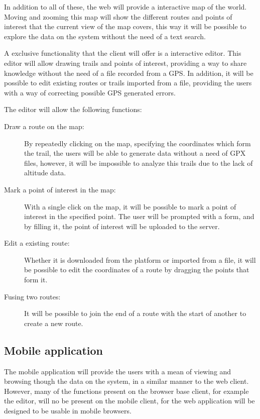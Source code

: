 In addition to all of these, the web will provide a interactive map of the world. Moving and zooming this map will show the different routes and points of interest that the current view of the map covers, this way it will be possible to explore the data on the system without the need of a text search.

A exclusive functionality that the client will offer is a interactive editor. This editor will allow drawing trails and points of interest, providing a way to share knowledge without the need of a file recorded from a GPS. In addition, it will be possible to edit existing routes or trails imported from a file, providing the users with a way of correcting possible GPS generated errors.

The editor will allow the following functions:

\begin{description}
\item[Draw a route on the map:] By repeatedly clicking on the map, specifying the coordinates which form the trail, the users will be able to generate data without a need of GPX files, however, it will be impossible to analyze this trails due to the lack of altitude data.

\item[Mark a point of interest in the map:] With a single click on the map, it will be possible to mark a point of interest in the specified point. The user will be prompted with a form, and by filling it, the point of interest will be uploaded to the server.

\item[Edit a existing route:] Whether it is downloaded from the platform or imported from a file, it will be possible to edit the coordinates of a route by dragging the points that form it.

\item[Fusing two routes:] It will be possible to join the end of a route with the start of another to create a new route.
\end{description}

\subsection{Mobile application}

The mobile application will provide the users with a mean of viewing and browsing though the data on the system, in a similar manner to the web client. However, many of the functions present on the browser base client, for example the editor, will no be present on the mobile client, for the web application will be designed to be usable in mobile browsers.

